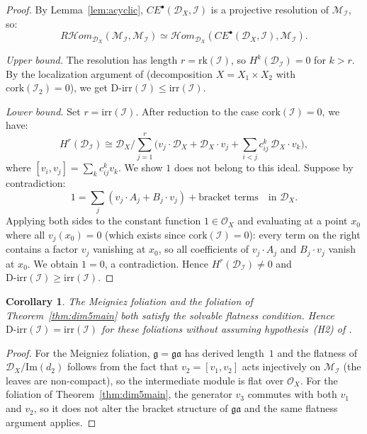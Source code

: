 \documentclass[12pt,a4paper]{article}
\newtheorem{corollary}[theorem]{Corollary}
\begin{document}
\begin{proof}
By Lemma~\ref{lem:acyclic}, $CE^\bullet(\mathcal{D}_X,\mathcal{I})$ is
a projective resolution of $\mathcal{M}_{\mathcal{I}}$, so:
\[
R\mathcal{H}om_{\mathcal{D}_X}(\mathcal{M}_{\mathcal{I}},
\mathcal{M}_{\mathcal{I}})
\simeq
\mathcal{H}om_{\mathcal{D}_X}(CE^\bullet(\mathcal{D}_X,\mathcal{I}),
\mathcal{M}_{\mathcal{I}}).
\]

\textit{Upper bound.}
The resolution has length $r = \mathrm{rk}(\mathcal{I})$, so
$H^k(\mathcal{D}_{\mathcal{I}}) = 0$ for $k > r$. By the localization
argument of \cite[Thm.~3.6(A)]{D16} (decomposition $X = X_1 \times X_2$
with $\mathrm{cork}(\mathcal{I}_2) = 0$), we get
$\mathrm{D\text{-}irr}(\mathcal{I}) \leq \mathrm{irr}(\mathcal{I})$.

\textit{Lower bound.}
Set $r = \mathrm{irr}(\mathcal{I})$. After reduction to the case
$\mathrm{cork}(\mathcal{I}) = 0$, we have:
\[
H^r(\mathcal{D}_{\mathcal{I}})
\cong \mathcal{D}_X \Big/
\sum_{j=1}^r \bigl(v_j \cdot \mathcal{D}_X + \mathcal{D}_X \cdot v_j
+ \sum_{i<j} c_{ij}^k\, \mathcal{D}_X \cdot v_k\bigr),
\]
where $[v_i,v_j] = \sum_k c_{ij}^k v_k$. We show $1$ does not belong to
this ideal. Suppose by contradiction:
\[
1 = \sum_j (v_j \cdot A_j + B_j \cdot v_j) + \text{bracket terms}
\quad \text{in } \mathcal{D}_X.
\]
Applying both sides to the constant function $1 \in \mathcal{O}_X$
and evaluating at a point $x_0$ where all $v_j(x_0) = 0$ (which exists
since $\mathrm{cork}(\mathcal{I}) = 0$): every term on the right
contains a factor $v_j$ vanishing at $x_0$, so all coefficients of
$v_j \cdot A_j$ and $B_j \cdot v_j$ vanish at $x_0$. We obtain
$1 = 0$, a contradiction. Hence
$H^r(\mathcal{D}_{\mathcal{I}}) \neq 0$ and
$\mathrm{D\text{-}irr}(\mathcal{I}) \geq \mathrm{irr}(\mathcal{I})$.
\end{proof}

\begin{corollary}\label{cor:meigniez-weakening}
The Meigniez foliation and the foliation of Theorem~\ref{thm:dim5main}
both satisfy the solvable flatness condition. Hence
$\mathrm{D\text{-}irr}(\mathcal{I}) = \mathrm{irr}(\mathcal{I})$
for these foliations without assuming hypothesis~(H2) of \cite{D16}.
\end{corollary}

\begin{proof}
For the Meigniez foliation, $\mathfrak{g} = \mathfrak{ga}$ has derived
length~$1$ and the flatness of
$\mathcal{D}_X / \mathrm{Im}(d_2)$ follows from the fact that $v_2 =
[v_1,v_2]$ acts injectively on $\mathcal{M}_{\mathcal{I}}$ (the leaves
are non-compact), so the intermediate module is flat over $\mathcal{O}_X$.
For the foliation of Theorem~\ref{thm:dim5main}, the generator $v_3$
commutes with both $v_1$ and $v_2$, so it does not alter the bracket
structure of $\mathfrak{ga}$ and the same flatness argument applies.
\end{proof}
\end{document}
